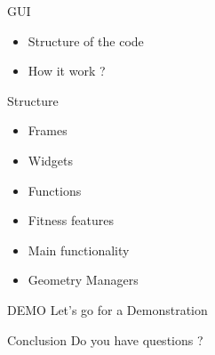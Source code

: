 \documentclass{beamer}
\begin{document}
    \begin{frame}{GUI}
        \begin{center}
            \small{
                \begin{itemize}
                    \item Structure of the code
                    \item How it work ?
                \end{itemize}
            }
        \end{center}
    \end{frame}

    \begin{frame}{Structure}
        \begin{center}
            \small{
                \begin{itemize}
                    \item Frames
                    \item Widgets
                    \item Functions
                    \item Fitness features
                    \item Main functionality
                    \item Geometry Managers
                \end{itemize}
            }
        \end{center}
    \end{frame}

    \begin{frame}{DEMO}
        \LARGE Let's go for a Demonstration
    \end{frame}

    \begin{frame}{Conclusion}
        \LARGE Do you have questions ?
    \end{frame}
\end{document}
